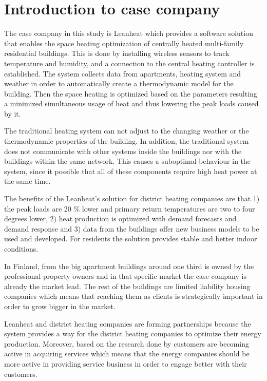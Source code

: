 \section{Introduction to case company}

The case company in this study is Leanheat which provides a software solution that enables the space  heating optimization of centrally heated multi-family residential buildings. This is done by installing wireless sensors to track temperature and humidity, and a connection to the central heating controller is established. The system collects data from apartments, heating system and weather in order to automatically create a thermodynamic model for the building. Then the space heating is optimized based on the parameters resulting a minimized simultaneous usage of heat and thus lowering the peak loads caused by it. \parencite{LenheatArticle:2019}

The traditional heating system can not adjust to the changing weather or the thermodynamic properties of the building. In addition, the traditional system does not communicate with other systems inside the buildings nor with the buildings within the same network. This causes a suboptimal behaviour in the system, since it possible that all of these components require high heat power at the same time. \parencite{LenheatArticle:2019}

The benefits of the Leanheat's solution for district heating companies are that 1) the peak loads are 20 \% lower and primary return temperatures are two to four degrees lower, 2) heat production is optimized with demand forecasts and demand response and 3) data from the buildings offer new business models to be used and developed. For residents the solution provides stable and better indoor conditions. \parencite{LenheatArticle:2019}

In Finland, from the big apartment buildings around one third is owned by the professional property owners and in that specific market the case company is already the market lead. The rest of the buildings are limited liability housing companies which means that reaching them as clients is strategically important in order to grow bigger in the market.

Leanheat and district heating companies are forming partnerships because the system provides a way for the district heating companies to optimize their energy production. Moreover, based on the research done by \textcite{Energyindustry:2019} customers are becoming active in acquiring services which means that the energy companies should be more active in providing service business in order to engage better with their customers.

